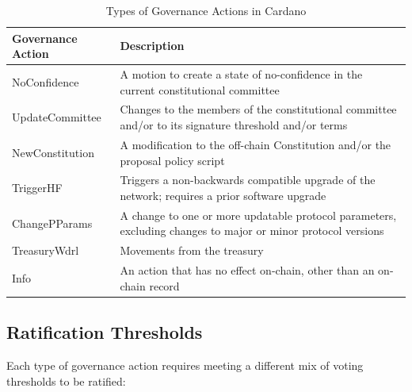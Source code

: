 \begin{table}[ht]
\centering
\small
\begin{tabular}{|l|p{10cm}|}
\hline
\textbf{Governance Action} & \textbf{Description} \\ \hline
NoConfidence & A motion to create a state of no-confidence in the current constitutional committee \\ \hline
UpdateCommittee & Changes to the members of the constitutional committee and/or to its signature threshold and/or terms \\ \hline
NewConstitution & A modification to the off-chain Constitution and/or the proposal policy script \\ \hline
TriggerHF & Triggers a non-backwards compatible upgrade of the network; requires a prior software upgrade \\ \hline
ChangePParams & A change to one or more updatable protocol parameters, excluding changes to major or minor protocol versions \\ \hline
TreasuryWdrl & Movements from the treasury \\ \hline
Info & An action that has no effect on-chain, other than an on-chain record \\ \hline
\end{tabular}
\caption{Types of Governance Actions in Cardano}
\end{table}

\subsection{Ratification Thresholds}

Each type of governance action requires meeting a different mix of voting thresholds to be ratified:

